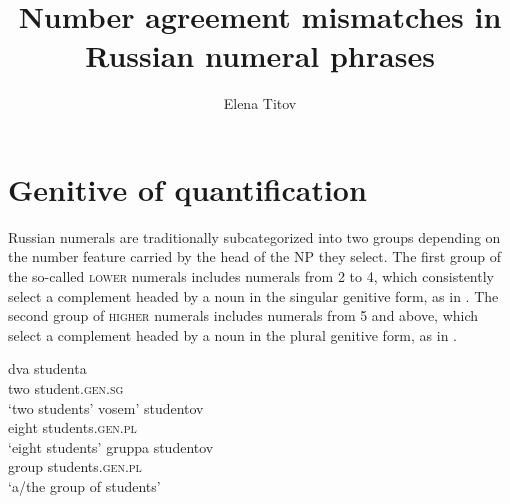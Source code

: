 \documentclass[output=paper,
modfonts,
newtxmath,
hidelinks
]{langscibook}
\title{Number agreement mismatches in Russian numeral phrases}
\author{%
 Elena Titov\affiliation{University College London}}
\begin{document}
\maketitle

\section{Genitive of quantification}\label{s1}

Russian numerals are traditionally subcategorized into two groups depending on the number feature carried by the head of the NP they select. The first group of the so-called \textsc{lower} numerals includes numerals from 2 to 4, which consistently select a complement headed by a noun in the singular genitive form, as in . The second group of \textsc{higher} numerals includes numerals from 5 and above, which select a complement headed by a noun in the plural genitive form, as in . 

\begin{multicols}{2}
\ea \label{ex1}
\gll dva   studenta\\
     two  student.\textsc{gen.sg}\\
\glt `two students'
\z
\columnbreak
\ea \label{ex2}
\gll vosem’  studentov\\
     eight  students.\textsc{gen.pl}\\
\glt `eight students'
\z
\columnbreak
\ea \label{ex3}
\gll gruppa  studentov\\
     group   students.\textsc{gen.pl}\\
\glt `a/the group of students'
\z
\end{multicols}
\end{document}
